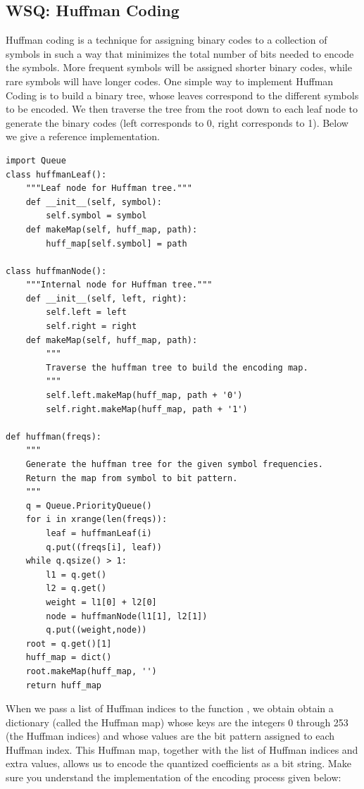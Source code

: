 \subsection*{WSQ: Huffman Coding}
Huffman coding is a technique for assigning binary codes to a collection of symbols in such a way
that minimizes the total number of bits needed to encode the symbols.
More frequent symbols will be assigned shorter binary codes, while rare symbols will have
longer codes.
One simple way to implement Huffman Coding is to build a binary tree, whose leaves correspond
to the different symbols to be encoded.
We then traverse the tree from the root down to each leaf node to generate the binary codes
(left corresponds to 0, right corresponds to 1).
Below we give a reference implementation.
\begin{lstlisting}
import Queue
class huffmanLeaf():
    """Leaf node for Huffman tree."""
    def __init__(self, symbol):
        self.symbol = symbol
    def makeMap(self, huff_map, path):
        huff_map[self.symbol] = path

class huffmanNode():
    """Internal node for Huffman tree."""
    def __init__(self, left, right):
        self.left = left
        self.right = right
    def makeMap(self, huff_map, path):
        """
        Traverse the huffman tree to build the encoding map.
        """
        self.left.makeMap(huff_map, path + '0')
        self.right.makeMap(huff_map, path + '1')

def huffman(freqs):
    """
    Generate the huffman tree for the given symbol frequencies.
    Return the map from symbol to bit pattern.
    """
    q = Queue.PriorityQueue()
    for i in xrange(len(freqs)):
        leaf = huffmanLeaf(i)
        q.put((freqs[i], leaf))
    while q.qsize() > 1:
        l1 = q.get()
        l2 = q.get()
        weight = l1[0] + l2[0]
        node = huffmanNode(l1[1], l2[1])
        q.put((weight,node))
    root = q.get()[1]
    huff_map = dict()
    root.makeMap(huff_map, '')
    return huff_map
\end{lstlisting}
When we pass a list of Huffman indices to the function , we obtain
obtain a dictionary (called the Huffman map) whose keys are the integers 0 through 253 (the Huffman indices)
and whose values are the bit pattern assigned to each Huffman index.
This Huffman map, together with the list of Huffman indices and extra values,
allows us to encode the quantized coefficients as a bit string.
Make sure you understand the implementation of the encoding process given below:
